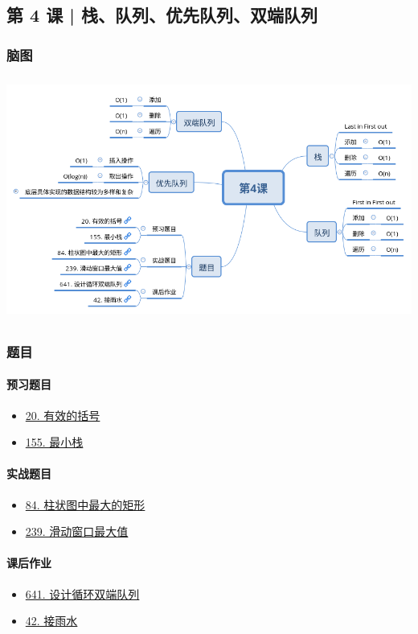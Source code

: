 \subsection{第 4 课 | 栈、队列、优先队列、双端队列}

\subsubsection{脑图}

\includegraphics[width=170mm,height=80mm]{images/camp/第4课.png}

\subsubsection{题目}

\paragraph{预习题目}

\begin{itemize}
  \item \hyperref[leetcode:20]{20. 有效的括号}
  \item \hyperref[leetcode:155]{155. 最小栈}
\end{itemize}

\paragraph{实战题目}

\begin{itemize}
  \item \hyperref[leetcode:84]{84. 柱状图中最大的矩形}
  \item \hyperref[leetcode:239]{239. 滑动窗口最大值}
\end{itemize}

\paragraph{课后作业}

\begin{itemize}
  \item \hyperref[leetcode:641]{641. 设计循环双端队列}
  \item \hyperref[leetcode:42]{42. 接雨水}
\end{itemize}
